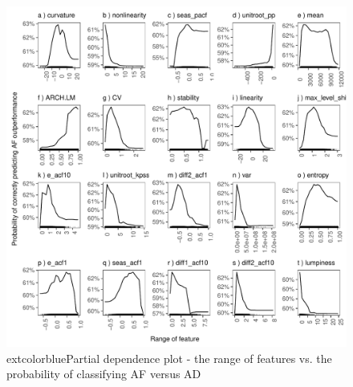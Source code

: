 \documentclass[preprint, 3p,
authoryear]{elsarticle} %
\begin{document}
\begin{figure}[H]

{\centering \includegraphics[width=1\linewidth]{img/300dpi/partial_dependence1} 

}

\caption{   extcolor{blue}{Partial dependence plot - the range of features vs. the probability of classifying AF versus AD} }\label{fig:pdpcommon1}
\end{figure}
\end{document}
